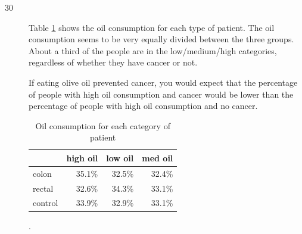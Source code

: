 \documentclass[letterpaper, landscape]{exam}
\begin{document}
\begin{description}
    \item[30]



      Table \ref{tab:ex30b} shows the oil consumption for each type of patient.
      The oil consumption seems to be very equally divided between the three
      groups.  About a third of the people are in the low/medium/high
      categories, regardless of whether they have cancer or not.

      If eating olive oil prevented cancer, you would expect that the percentage
      of people with high oil consumption and cancer would be lower than the
      percentage of people with high oil consumption and no cancer.

      \begin{table}[H]
        \centering
        \begin{tabular}{lrrr}
          \toprule
                  & high oil & low oil & med oil \\
          \midrule
          colon   & 35.1\%   & 32.5\%  & 32.4\% \\
          rectal  & 32.6\%   & 34.3\%  & 33.1\% \\
          control & 33.9\%   & 32.9\%  & 33.1\% \\
          \bottomrule
        \end{tabular}
        \caption{Oil consumption for each category of patient}.
        \label{tab:ex30b}
      \end{table}



\end{description}
\end{document}

